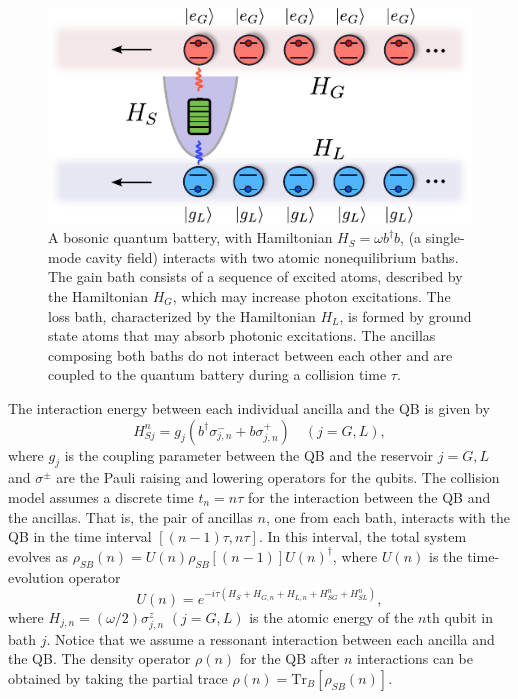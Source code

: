 \documentclass[%
reprint,
superscriptaddress,
amsmath,amssymb,
aps,
pra,
]{revtex4-2}
\begin{document}
\begin{figure}[H]
\includegraphics[width=0.9\linewidth]{fig1.pdf}
\caption{A bosonic quantum battery, with Hamiltonian $H_S = \omega b^{\dagger}b$, (a single-mode cavity field) interacts with two atomic nonequilibrium baths. The gain bath consists of a sequence of excited atoms, described by the Hamiltonian $H_G$, which may increase photon excitations. The loss bath, characterized by the Hamiltonian $H_L$, is formed by ground state atoms that may absorb photonic excitations. The ancillas composing both baths do not interact between each other and are coupled to the quantum battery during a collision time $\tau$.}
\label{fig1} 
\end{figure}

The interaction energy between each individual ancilla and the QB is given by 
\begin{equation}
    H_{Sj}^n = g_j(b^{\dagger} \sigma_{j,n}^{-} + b\sigma_{j,n}^{+}) \quad (j = G,L),
\end{equation}
where $g_j$ is the coupling parameter between the QB and the reservoir $j=G,L$ and $\sigma^{\pm}$ are the Pauli raising and lowering operators for the qubits. The collision model assumes a discrete time $t_n = n\tau$ for the interaction between the QB and the ancillas. That is, the pair of ancillas $n$, one from each bath, interacts with the QB in the time interval $[(n-1)\tau, n\tau]$. In this interval, the total system evolves as $\rho_{SB}(n) = U(n) \rho_{SB}[(n-1)] U(n)^{\dagger}$, where $U(n)$ is the time-evolution operator
\begin{equation}
    U(n) = e^{-i\tau(H_S + H_{G,n} + H_{L,n} + H^n_{SG} + H^n_{SL})},
\end{equation} 
where $H_{j,n} = (\omega/2)\sigma^{z}_{j,n}$ $(j=G,L)$ is the atomic energy of the $n$th qubit in bath $j$. Notice that we assume a ressonant interaction between each ancilla and the QB. The density operator $\rho(n)$ for the QB after $n$ interactions can be obtained by taking the partial trace $\rho(n) = \text{Tr}_{B}[\rho_{SB}(n)]$.
\end{document}
